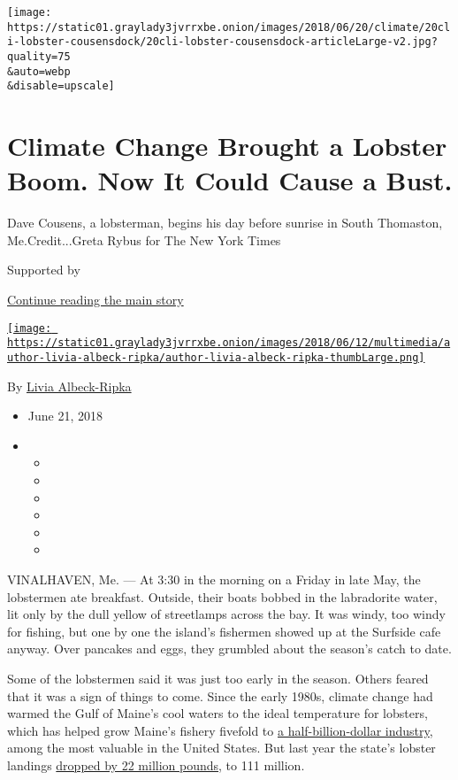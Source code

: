 \texttt{[image: https://static01.graylady3jvrrxbe.onion/images/2018/06/20/climate/20cli-lobster-cousensdock/20cli-lobster-cousensdock-articleLarge-v2.jpg?quality=75\\\&auto=webp\\\&disable=upscale]}

\hypertarget{climate-change-brought-a-lobster-boom-now-it-could-cause-a-bust}{%
\section{Climate Change Brought a Lobster Boom. Now It Could Cause a
Bust.}\label{climate-change-brought-a-lobster-boom-now-it-could-cause-a-bust}}

Dave Cousens, a lobsterman, begins his day before sunrise in South
Thomaston, Me.Credit...Greta Rybus for The New York Times

Supported by

\protect\hyperlink{after-sponsor}{Continue reading the main story}

\href{https://www.nytimes3xbfgragh.onion/by/livia-albeck-ripka}{\texttt{[image: https://static01.graylady3jvrrxbe.onion/images/2018/06/12/multimedia/author-livia-albeck-ripka/author-livia-albeck-ripka-thumbLarge.png]}}

By \href{https://www.nytimes3xbfgragh.onion/by/livia-albeck-ripka}{Livia
Albeck-Ripka}

\begin{itemize}
\item
  June 21, 2018
\item
  \begin{itemize}
  \item
  \item
  \item
  \item
  \item
  \item
  \end{itemize}
\end{itemize}

VINALHAVEN, Me. --- At 3:30 in the morning on a Friday in late May, the
lobstermen ate breakfast. Outside, their boats bobbed in the labradorite
water, lit only by the dull yellow of streetlamps across the bay. It was
windy, too windy for fishing, but one by one the island's fishermen
showed up at the Surfside cafe anyway. Over pancakes and eggs, they
grumbled about the season's catch to date.

Some of the lobstermen said it was just too early in the season. Others
feared that it was a sign of things to come. Since the early 1980s,
climate change had warmed the Gulf of Maine's cool waters to the ideal
temperature for lobsters, which has helped grow Maine's fishery fivefold
to
\href{https://www.maine.gov/dmr/commercial-fishing/landings/documents/2017ValueBySpecies.Pie.Graph.pdf}{a
half-billion-dollar industry}, among the most valuable in the United
States. But last year the state's lobster landings
\href{http://www.maine.gov/dmr/commercial-fishing/landings/documents/lobster.table.pdf}{dropped
by 22 million pounds}, to 111 million.


